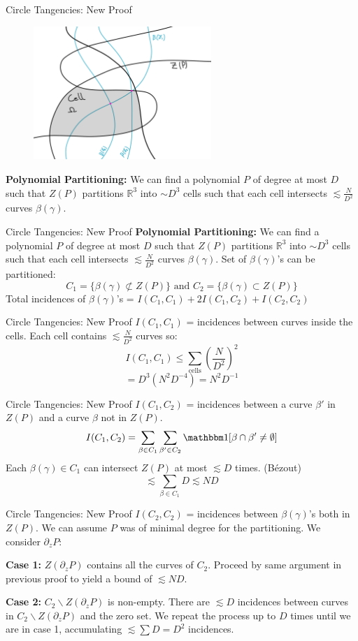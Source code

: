 \documentclass{beamer}
\newcommand{\OO}{\mathbbm 1}
\newcommand{\RR}{\mathbb R}
\newcommand{\nfr}[1]{\begin{frame} #1
\end{frame}}
\begin{document}
\nfr{{Circle Tangencies: New Proof }
\begin{figure}[h]
    \centering
    \includegraphics[width=0.6\textwidth]{images/new_proof_c.png}
\end{figure}
\textbf{Polynomial Partitioning:} We can find a polynomial $P$ of degree at most $D$ such that $Z(P)$ partitions $\RR^3$ into $\sim D^3$ cells such that each cell intersects $\lesssim \frac{N}{D^2}$ curves $\beta(\gamma)$.
}

\nfr{{Circle Tangencies: New Proof }
\textbf{Polynomial Partitioning:} We can find a polynomial $P$ of degree at most $D$ such that $Z(P)$ partitions $\RR^3$ into $\sim D^3$ cells such that each cell intersects $\lesssim \frac{N}{D^2}$ curves $\beta(\gamma)$.
Set of $\beta(\gamma)$'s can be partitioned:
\[
   C_1 = \{\beta(\gamma) \not \subset Z(P) \} \text{ and } C_2 = \{\beta(\gamma) \subset Z(P) \} 
\]
Total incidences of $\beta(\gamma)$'s = $I(C_1,C_1) +2I(C_1,C_2) + I(C_2,C_2)$  
}
\nfr{{Circle Tangencies: New Proof }
$I(C_1,C_1)$ = incidences between curves inside the cells. Each cell contains $\lesssim \frac{N}{D^2}$ curves so:
\[
  I(C_1,C_1) \leq \sum_{\text{cells}} \left(\frac{N}{D^2} \right)^2 
\]
\[
 = D^3 (N^2 D^{-4}) = N^2D^{-1}
\]
}

\nfr{{Circle Tangencies: New Proof }
$I(C_1,C_2)$ = incidences between a curve $\beta'$ in $Z(P)$ and a curve $\beta$ not in $Z(P)$.
\[
    I(C_1,C_2) = \sum_{\beta \in C_1} \sum_{\beta' \in C_2} \OO[\beta \cap \beta' \neq \emptyset]
\]
Each $\beta(\gamma) \in C_1$ can intersect $Z(P)$ at most $\lesssim D$ times. (Bézout)
\[
\lesssim  \sum_{\beta \in C_1} D \lesssim ND
\]
}

\nfr{{Circle Tangencies: New Proof }
$I(C_2,C_2)$ = incidences between $\beta(\gamma)$'s both in $Z(P)$. 
We can assume $P$ was of minimal degree for the partitioning.
We consider $\partial_z P$:

\textbf{Case 1:} $Z(\partial_z P)$ contains all the curves of $C_2$. Proceed by same argument in previous proof to yield a bound of $\lesssim ND$.

\pause
\textbf{Case 2:} $C_2 \backslash Z(\partial_z P)$ is non-empty. There are $\lesssim D$ incidences between curves in $C_2 \backslash Z(\partial_z P)$ and the zero set. 
We repeat the process up to $D$ times until we are in case 1, accumulating $ \lesssim \sum D = D^2$ incidences.
}
\end{document}
